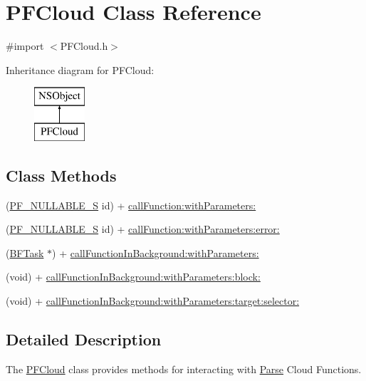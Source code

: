 \hypertarget{interface_p_f_cloud}{}\section{P\+F\+Cloud Class Reference}
\label{interface_p_f_cloud}


{\ttfamily \#import $<$P\+F\+Cloud.\+h$>$}

Inheritance diagram for P\+F\+Cloud\+:\begin{figure}[H]
\begin{center}
\leavevmode
\includegraphics[height=2.000000cm]{interface_p_f_cloud}
\end{center}
\end{figure}
\subsection*{Class Methods}
\begin{DoxyCompactItemize}
\item 
(\hyperlink{_p_f_nullability_8h_ada31c80e56a25740ae808dccdacc9f1a}{P\+F\+\_\+\+N\+U\+L\+L\+A\+B\+L\+E\+\_\+\+S} id) + \hyperlink{interface_p_f_cloud_af7b5a07bf638cd458d531e72f793fd0f}{call\+Function\+:with\+Parameters\+:}
\item 
(\hyperlink{_p_f_nullability_8h_ada31c80e56a25740ae808dccdacc9f1a}{P\+F\+\_\+\+N\+U\+L\+L\+A\+B\+L\+E\+\_\+\+S} id) + \hyperlink{interface_p_f_cloud_a1356f5a6e82e63aa5210c9f19dc728dc}{call\+Function\+:with\+Parameters\+:error\+:}
\item 
(\hyperlink{interface_b_f_task}{B\+F\+Task} $\ast$) + \hyperlink{interface_p_f_cloud_a7e4853fb17bb93a8e6c4c36c5f563bed}{call\+Function\+In\+Background\+:with\+Parameters\+:}
\item 
(void) + \hyperlink{interface_p_f_cloud_a0c3ae9ef1dce00f8a11943d2a07bc264}{call\+Function\+In\+Background\+:with\+Parameters\+:block\+:}
\item 
(void) + \hyperlink{interface_p_f_cloud_abab6931194eff2635b764b589075d376}{call\+Function\+In\+Background\+:with\+Parameters\+:target\+:selector\+:}
\end{DoxyCompactItemize}


\subsection{Detailed Description}
The {\ttfamily \hyperlink{interface_p_f_cloud}{P\+F\+Cloud}} class provides methods for interacting with \hyperlink{interface_parse}{Parse} Cloud Functions. 

